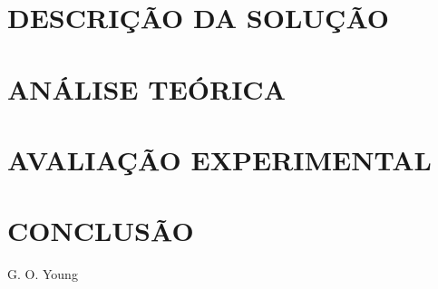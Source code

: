 \documentclass[a4paper, 12pt, conference, portuguese]{ieeeconf}      %
\begin{document}
\section{DESCRIÇÃO DA SOLUÇÃO}\label{sol}

\section{ANÁLISE TEÓRICA}\label{theoric}

\section{AVALIAÇÃO EXPERIMENTAL}\label{experimental}

\section{CONCLUSÃO}\label{conclusion}

\begin{thebibliography}{99}

 G. O. Young

\end{thebibliography}
\end{document}

